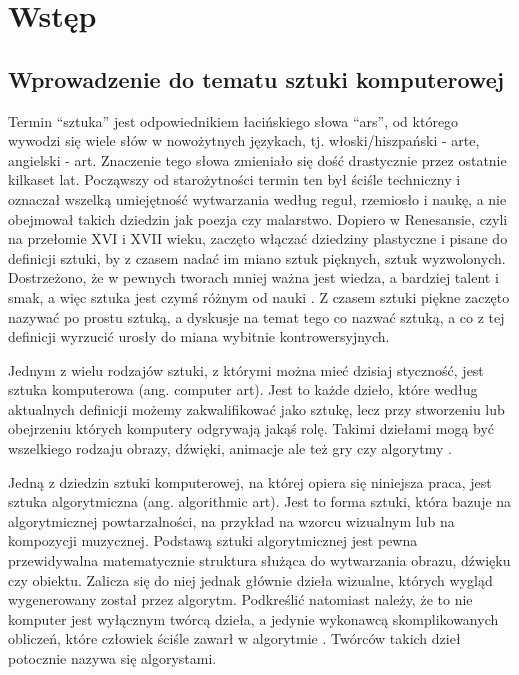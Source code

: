 \chapter{Wstęp} \label{intro}
    \section{Wprowadzenie do tematu sztuki komputerowej} \label{intro-intro}
    Termin ``sztuka'' jest odpowiednikiem łacińskiego słowa ``ars'', od którego wywodzi się wiele słów w nowożytnych językach, tj. włoski/hiszpański - arte, angielski - art. Znaczenie tego słowa zmieniało się dość drastycznie przez ostatnie kilkaset lat. Począwszy od starożytności termin ten był ściśle techniczny i oznaczał wszelką umiejętność wytwarzania według reguł, rzemiosło i naukę, a nie obejmował takich dziedzin jak poezja czy malarstwo.
    Dopiero w Renesansie, czyli na przełomie XVI i XVII wieku, zaczęto włączać dziedziny plastyczne i pisane do definicji sztuki, by z czasem nadać im miano sztuk pięknych, sztuk wyzwolonych. Dostrzeżono, że w pewnych tworach mniej ważna jest wiedza, a bardziej talent i smak, a więc sztuka jest czymś różnym od nauki \cite{sztuka}.
    Z czasem sztuki piękne zaczęto nazywać po prostu sztuką, a dyskusje na temat tego co nazwać sztuką, a co z tej definicji wyrzucić urosły do miana wybitnie kontrowersyjnych. 
    
    Jednym z wielu rodzajów sztuki, z którymi można mieć dzisiaj styczność, jest sztuka komputerowa (ang. computer art). Jest to każde dzieło, które według aktualnych definicji możemy zakwalifikować jako sztukę, lecz przy stworzeniu lub obejrzeniu których komputery odgrywają jakąś rolę. Takimi dziełami mogą być wszelkiego rodzaju obrazy, dźwięki, animacje ale też gry czy algorytmy \cite{computer-art}.
    
    Jedną z dziedzin sztuki komputerowej, na której opiera się niniejsza praca, jest sztuka algorytmiczna (ang. algorithmic art). Jest to forma sztuki, która bazuje na algorytmicznej powtarzalności, na przykład na wzorcu wizualnym lub na kompozycji muzycznej. Podstawą sztuki algorytmicznej jest pewna przewidywalna matematycznie struktura służąca do wytwarzania obrazu, dźwięku czy obiektu.
    Zalicza się do niej jednak głównie dzieła wizualne, których wygląd wygenerowany został przez algorytm. Podkreślić natomiast należy, że to nie komputer jest wyłącznym twórcą dzieła, a jedynie wykonawcą skomplikowanych obliczeń, które człowiek ściśle zawarł w algorytmie \cite{selected-works}. Twórców takich dzieł potocznie nazywa się algorystami.
    
